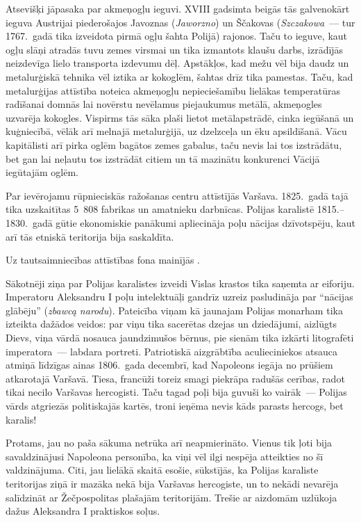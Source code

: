 \documentclass[twoside,a5paper,12pt,fleqn,openany]{extbook}
\newcommand{\pltxti}[1]{\textit{\textpolish{#1}}}
\begin{document}
Atsevišķi jāpasaka par akmeņogļu ieguvi. XVIII gadsimta beigās tās galvenokārt ieguva Austrijai piederošajos Javoznas (\pltxti{Jaworzno}) un Ščakovas (\pltxti{Szczakowa}~--- tur 1767.~gadā tika izveidota pirmā ogļu šahta Polijā) rajonos. Taču to ieguve, kaut ogļu slāņi atradās tuvu zemes virsmai un tika izmantots klaušu darbs, izrādījās neizdevīga lielo transporta izdevumu dēļ. Apstākļos, kad mežu vēl bija daudz un metalurģiskā tehnika vēl iztika ar kokoglēm, šahtas drīz tika pamestas. Taču, kad metalurģijas attīstība noteica akmeņogļu nepieciešamību lielākas temperatūras radīšanai domnās lai novērstu nevēlamus piejaukumus metālā, akmeņogles uzvarēja kokogles. Vispirms tās sāka plaši lietot metālapstrādē, cinka iegūšanā un kuģniecībā, vēlāk arī melnajā metalurģijā, uz dzelzceļa un ēku apsildīšanā. Vācu kapitālisti arī pirka oglēm bagātos zemes gabalus, taču nevis lai tos izstrādātu, bet gan lai neļautu tos izstrādāt citiem un tā mazinātu konkurenci Vācijā iegūtajām oglēm.

Par ievērojamu rūpnieciskās ražošanas centru attīstījās Varšava. 1825.~gadā tajā tika uzskaitītas 5~808 fabrikas un amatnieku darbnīcas. Polijas karalistē 1815.--1830.~gadā gūtie ekonomiskie panākumi apliecināja poļu nācijas dzīvotspēju, kaut arī tās etniskā teritorija bija saskaldīta.

Uz tautsaimniecības attīstības fona mainījās .

Sākotnēji ziņa par Polijas karalistes izveidi Vislas krastos tika saņemta ar eiforiju. Imperatoru Aleksandru I poļu intelektuāļi gandrīz uzreiz pasludināja par ``nācijas glābēju'' (\pltxti{zbawcą narodu}). Pateicība viņam kā jaunajam Polijas monarham tika izteikta dažādos veidos: par viņu tika sacerētas dzejas un dziedājumi, aizlūgts Dievs, viņa vārdā nosauca jaundzimušos bērnus, pie sienām tika izkārti litografēti imperatora~--- labdara portreti. Patriotiskā aizgrābtība aculieciniekos atsauca atmiņā līdzīgas ainas 1806.~gada decembrī, kad Napoleons iegāja no prūšiem atkarotajā Varšavā. Tiesa, francūži toreiz smagi piekrāpa radušās cerības, radot tikai necilo Varšavas hercogisti. Taču tagad poļi bija guvuši ko vairāk~--- Polijas vārds atgriezās politiskajās kartēs, troni ieņēma nevis kāds parasts hercogs, bet karalis!

Protams, jau no paša sākuma netrūka arī neapmierināto. Vienus tik ļoti bija savaldzinājusi Napoleona personība, ka viņi vēl ilgi nespēja atteikties no šī valdzinājuma. Citi, jau lielākā skaitā esošie, sūkstījās, ka Polijas karaliste teritorijas ziņā ir mazāka nekā bija Varšavas hercogiste, un to nekādi nevarēja salīdzināt ar Žečpospolitas plašajām teritorijām. Trešie ar aizdomām uzlūkoja dažus Aleksandra I praktiskos soļus.
\end{document}

